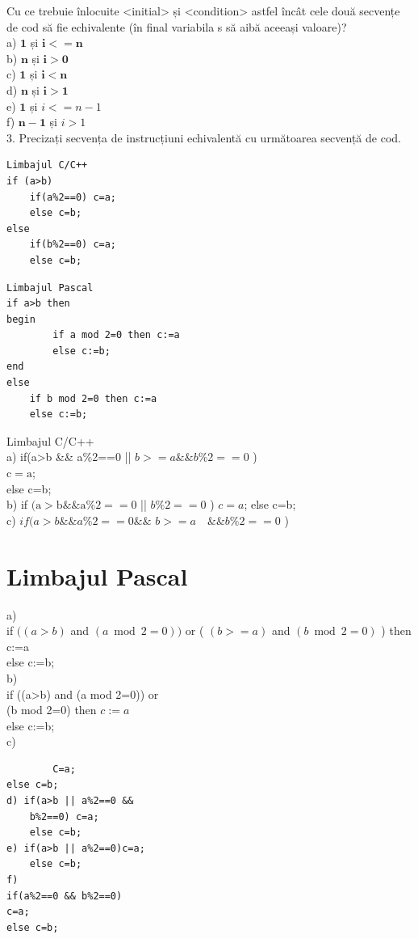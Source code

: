 \documentclass[10pt]{article}
\begin{document}
Cu ce trebuie înlocuite <initial> și <condition> astfel încât cele două secvențe de cod să fie echivalente (în final variabila s să aibă aceeași valoare)?\\
a) $\mathbf{1}$ și $\mathbf{i}<=\mathbf{n}$\\
b) $\mathbf{n}$ și $\mathbf{i}>\mathbf{0}$\\
c) $\mathbf{1}$ și $\mathbf{i}<\mathbf{n}$\\
d) $\mathbf{n}$ și $\mathbf{i}>\mathbf{1}$\\
e) $\mathbf{1}$ și $i<=n-1$\\
f) $\mathbf{n - 1}$ și $i>1$\\
3. Precizați secvența de instrucțiuni echivalentă cu următoarea secvență de cod.

\begin{verbatim}
Limbajul C/C++
if (a>b)
    if(a%2==0) c=a;
    else c=b;
else
    if(b%2==0) c=a;
    else c=b;
\end{verbatim}

\begin{verbatim}
Limbajul Pascal
if a>b then
begin
        if a mod 2=0 then c:=a
        else c:=b;
end
else
    if b mod 2=0 then c:=a
    else c:=b;
\end{verbatim}

Limbajul C/C++\\
a) if(a>b \&\& a\%2==0 || $b>=a \& \& b \% 2==0$ )\\
$\mathrm{c}=\mathrm{a}$;\\
else c=b;\\
b) if $(\mathrm{a}>\mathrm{b} \& \& \mathrm{a} \% 2==0$ || $b \% 2==0$ ) $c=a$; else c=b;\\
c) $i f(a>b \& \& a \% 2==0 \& \&$ $b>=a \quad \& \& b \% 2==0$ )

\section*{Limbajul Pascal}
a)\\
if $((a>b)$ and $(a \bmod 2=0))$ or ( $(b>=a)$ and $(b \bmod 2=0)$ ) then c:=a\\
else c:=b;\\
b)\\
if ((a>b) and (a mod 2=0)) or\\
(b mod 2=0) then $c:=a$\\
else c:=b;\\
c)

\begin{verbatim}
        C=a;
else c=b;
d) if(a>b || a%2==0 &&
    b%2==0) c=a;
    else c=b;
e) if(a>b || a%2==0)c=a;
    else c=b;
f)
if(a%2==0 && b%2==0)
c=a;
else c=b;
\end{verbatim}
\end{document}
